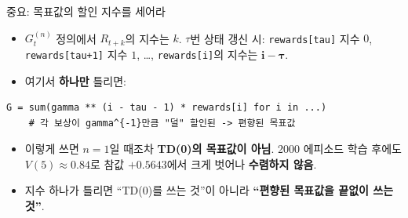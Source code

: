 \documentclass[aspectratio=169,11pt]{beamer}
\begin{document}

\begin{frame}[fragile]{중요: 목표값의 할인 지수를 세어라}
  \begin{itemize}
    \item $G_t^{(n)}$ 정의에서 $R_{t+k}$의 지수는 $k$. $\tau$번 상태
      갱신 시: \texttt{rewards[tau]} 지수 $0$, \texttt{rewards[tau+1]}
      지수 $1$, …, \texttt{rewards[i]}의 지수는 $\mathbf{i - \tau}$.
    \item 여기서 \textbf{하나만} 틀리면:
  \end{itemize}
  \begin{lstlisting}[basicstyle=\ttfamily\footnotesize]
    G = sum(gamma ** (i - tau - 1) * rewards[i] for i in ...)
    # 각 보상이 gamma^{-1}만큼 "덜" 할인된 -> 편향된 목표값
  \end{lstlisting}
  \begin{itemize}
    \item 이렇게 쓰면 $n=1$일 때조차 \textbf{TD(0)의 목표값이 아님}.
      2000 에피소드 학습 후에도 $V(5) \approx 0.84$로 참값
      $+0.5643$에서 크게 벗어나 \textbf{수렴하지 않음}.
    \item 지수 하나가 틀리면 ``TD(0)를 쓰는 것''이 아니라
      \textbf{``편향된 목표값을 끝없이 쓰는 것''}.
  \end{itemize}
\end{frame}
\end{document}
